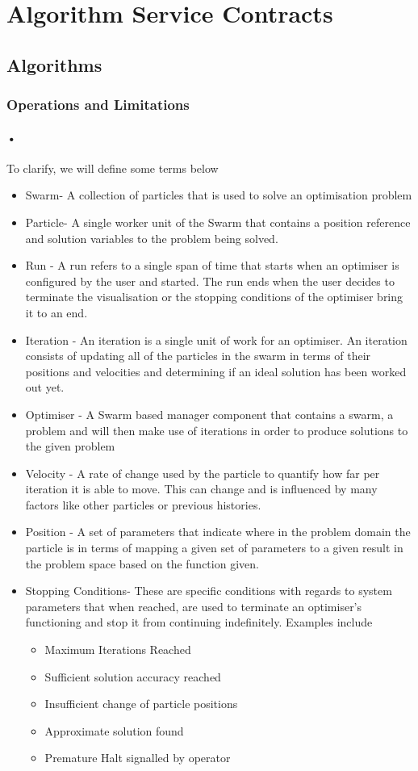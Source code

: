 \documentclass[11pt]{article}
\begin{document}
\section{Algorithm Service Contracts}
\subsection{Algorithms}
\subsubsection{Operations and Limitations}
\paragraph{•}
To clarify, we will define some terms below
\begin{itemize}
\item Swarm- A collection of particles that is used to solve an optimisation problem
\item Particle- A single worker unit of the Swarm that contains a position reference and solution variables to the problem being solved.
\item Run - A run refers to a single span of time that starts when an optimiser is configured by the user and started. The run ends when the user decides to terminate the visualisation or the stopping conditions of the optimiser bring it to an end.
\item Iteration - An iteration is a single unit of work for an optimiser. An iteration consists of updating all of the particles in the swarm in terms of their positions and velocities and determining if an ideal solution has been worked out yet.
\item Optimiser - A Swarm based manager component that contains a swarm, a problem and will then make use of iterations in order to produce solutions to the given problem
\item Velocity - A rate of change used by the particle to quantify how far per iteration it is able to move. This can change and is influenced by many factors like other particles or previous histories.
\item Position - A set of parameters that indicate where in the problem domain the particle is in terms of mapping a given set of parameters to a given result in the problem space based on the function given.
\item Stopping Conditions- These are specific conditions with regards to system parameters that when reached, are used to terminate an optimiser's functioning and stop it from continuing indefinitely. Examples include
\begin{itemize}
\item Maximum Iterations Reached
\item Sufficient solution accuracy reached
\item Insufficient change of particle positions
\item Approximate solution found
\item Premature Halt signalled by operator
\end{itemize}

\end{itemize}
\end{document}
